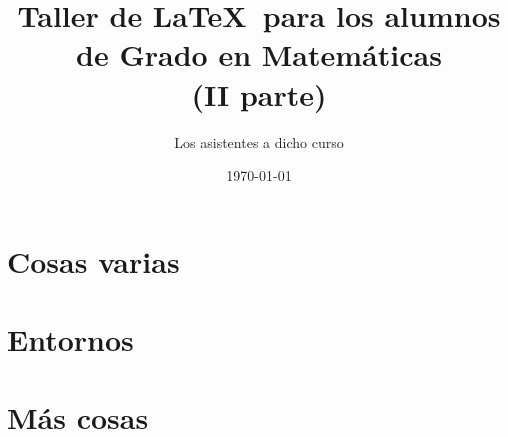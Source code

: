 \documentclass[11pt]{amsbook}
\title[Taller de LaTeX]{Taller de \LaTeX\ para los alumnos de Grado en Matemáticas\\ (II parte)}
\author[Los presentes]{Los asistentes a dicho curso}
\date{\today}
\begin{document}
\frontmatter %

\maketitle



\tableofcontents

\mainmatter %



\part{Cosas varias}










\part{Entornos}



\part{Más cosas}








\backmatter %


\cleardoublepage
{}




\cleardoublepage
{}


\printindex
\end{document}
